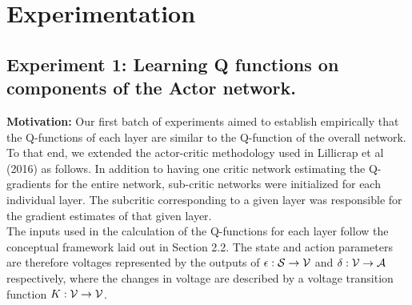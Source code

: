\section{Experimentation}
\subsection{Experiment 1: Learning Q functions on components of the Actor network.}
\textbf{Motivation:} 
Our first batch of experiments aimed to establish empirically that the Q-functions of each layer are similar to the Q-function of the overall network. To that end, we extended the actor-critic methodology used in Lillicrap et al (2016) as follows. In addition to  having one critic network estimating the Q-gradients for the entire network, sub-critic networks were initialized for each individual layer. The subcritic corresponding to a given layer was responsible for the gradient estimates of that given layer. \\
\newline
The inputs used in the calculation of the Q-functions for each layer follow the conceptual framework laid out in Section 2.2. The state and action parameters are therefore voltages represented by the outputs of $\epsilon : {\mathcal S} \to {\mathcal V}$ and $\delta : {\mathcal V} \to {\mathcal A}$ respectively, where the changes in voltage are described by a voltage transition function $K : {\mathcal V} \to {\mathcal V}$. \\